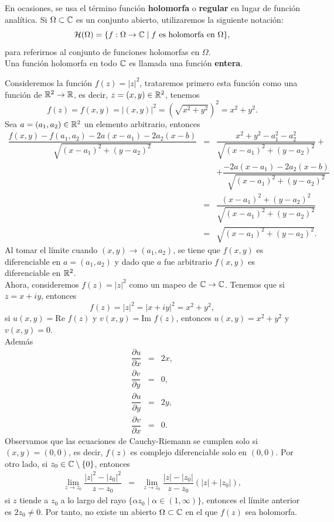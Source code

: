 En ocasiones, se usa el término función \textbf{holomorfa} o \textbf{regular} en lugar de función analítica. Si  $\Omega\subset \mathbb{C}$ es un conjunto abierto, utilizaremos la siguiente notación:
$$\mathcal{H}(\Omega)=\{f:\Omega\rightarrow \mathbb{C} \mid f \mbox{ es holomorfa en } \Omega\},$$
para referirnos al conjunto de funciones holomorfas en $\Omega$.\\
Una función holomorfa en todo $\mathbb{C}$   es llamada una función \textbf{entera}.
\begin{Ejem}
	Consideremos la función $f(z)=|z|^{2}$, trataremos primero esta función como una función de $\mathbb{R}^2\rightarrow\mathbb{R}$, es decir, $z=(x,y)\in\mathbb{R}^2$, tenemos 
	$$f(z)=f(x,y)=|(x,y)|^2=\left(\sqrt{x^{2}+y^{2}}\right)^2=x^2+y^2.$$
	Sea $a=(a_1,a_2)\in\mathbb{R}^2$ un elemento arbitrario, entonces 
	\[
	\begin{array}{ccl}
		\dfrac{f(x,y)-f(a_1,a_2)-2a(x-a_1)-2a_2(x-b)}{\sqrt{(x-a_1)^2+(y-a_2)^2}}&=&\dfrac{x^2+y^2-a_1^2-a_2^2}{\sqrt{(x-a_1)^2+(y-a_2)^2}}+\\
		&&+\dfrac{-2a(x-a_1)-2a_2(x-b)}{\sqrt{(x-a_1)^2+(y-a_2)^2}}\\
		&=&\dfrac{(x-a_1)^2+(y-a_2)^2}{\sqrt{(x-a_1)^2+(y-a_2)^2}}\\
		&=&\sqrt{(x-a_1)^2+(y-a_2)^2}.
	\end{array}
	\]
	Al tomar el límite cuando $(x,y)\rightarrow(a_1,a_2)$, se tiene que $f(x,y)$ es diferenciable en $a=(a_1,a_2)$ y dado que $a$ fue arbitrario $f(x,y)$ es diferenciable en $\mathbb{R}^2$.\\
	Ahora, consideremos  $f(z)=|z|^{2}$ como un mapeo de $\mathbb{C}\rightarrow\mathbb{C}$.
	Tenemos que si $z=x+iy$, entonces 
	$$f(z)=|z|^2=|x+iy|^2=x^2+y^2,$$
	si $u(x,y)=\mbox{Re }f(z)$ y $v(x,y)=\mbox{Im }f(z)$, entonces $u(x,y)=x^2+y^2$ y $v(x,y)=0$.\\ 
	Además
	\[
	\begin{array}{ccl}
		\dfrac{\partial u}{\partial x}&=&2x,\\
		\dfrac{\partial v}{\partial y}&=&0,\\
		\dfrac{\partial u}{\partial y}&=&2y,\\
		\dfrac{\partial v}{\partial x}&=&0.
	\end{array}
	\]
	Observamos que las ecuaciones de Cauchy-Riemann se cumplen solo si $(x,y)=(0,0)$, es decir, $f(z)$ es complejo diferenciable solo en $(0,0)$. Por otro lado, si $z_0\in \mathbb{C}\setminus\{0\}$, entonces 
	\[
	\begin{array}{ccl}
		\displaystyle	\lim_{z\rightarrow z_0}\dfrac{|z|^2-|z_0|^2}{z-z_0}&=&\displaystyle\lim_{z\rightarrow z_0}\dfrac{|z|-|z_0|}{z-z_0}(|z|+|z_0|),
	\end{array}
	\]
	si $z$ tiende a $z_0$ a lo largo del rayo $\{\alpha z_0\mid \alpha\in (1,\infty)\}$, entonces 
	el límite anterior es $2z_0\neq 0$. Por tanto, no existe un abierto $\Omega\subset \mathbb{C}$ en el que $f(z)$ sea holomorfa.\endproof
\end{Ejem}
